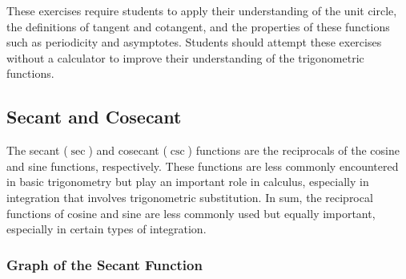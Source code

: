 \documentclass[a4paper,12pt]{book}
\begin{document}
These exercises require students to apply their understanding of the unit circle, the definitions of tangent and cotangent, and the properties of these functions such as periodicity and asymptotes. Students should attempt these exercises without a calculator to improve their understanding of the trigonometric functions.


\pgfplotsset{compat=newest} %



\subsection{Secant and Cosecant}
\label{subsec:secant_cosecant}

The secant (\(\sec\)) and cosecant (\(\csc\)) functions are the reciprocals of the cosine and sine functions, respectively. These functions are less commonly encountered in basic trigonometry but play an important role in calculus, especially in integration that involves trigonometric substitution.
In sum, the reciprocal functions of cosine and sine are less commonly used but equally important, especially in certain types of integration.


\subsubsection{Graph of the Secant Function}
\begin{center}
\end{center}
\end{document}
